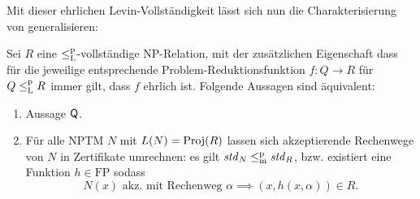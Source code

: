 Mit dieser ehrlichen Levin-Vollständigkeit lässt sich nun die Charakterisierung von \citeauthor[Thm.~2]{fenner_inverting_2003} generalisieren:
\begin{lemma}\label{lemma:q-generalized}
    Sei $R$ eine $\leq_\mathrm{L}^\mathrm{p}$-vollständige NP-Relation, mit der zusätzlichen Eigenschaft dass für die jeweilige entsprechende Problem-Reduktionsfunktion $f\colon Q\to R$ für $Q\leq_\mathrm{L}^\mathrm{p} R$ immer gilt, dass $f$ ehrlich ist.
Folgende Aussagen sind äquivalent:
\begin{enumerate}
    \item Aussage $\mathsf{Q}$.
    \item Für alle NPTM $N$ mit $L(N)=\operatorname{Proj}(R)$ lassen sich akzeptierende Rechenwege von $N$ in Zertifikate umrechnen: es gilt $\mathit{std}_N\leq_\mathrm{m}^\mathrm{p} \mathit{std}_R$, bzw. existiert eine Funktion $h\in\mathrm{FP}$ sodass
        \[ N(x) \text{ akz. mit Rechenweg $\alpha$} \implies (x,h(x,\alpha))\in R. \]
\end{enumerate}
\end{lemma}
